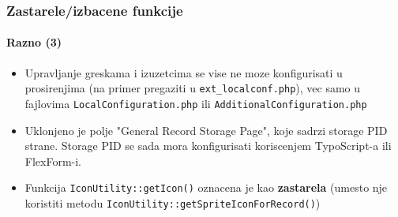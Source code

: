 \begin{frame}[fragile]
	\frametitle{Zastarele/izbacene funkcije}
	\framesubtitle{Razno (3)}

	\begin{itemize}

		\item Upravljanje greskama i izuzetcima se vise ne moze konfigurisati u prosirenjima (na primer pregaziti u
			\texttt{ext\_localconf.php}), vec samo u fajlovima \texttt{LocalConfiguration.php} ili
			\texttt{AdditionalConfiguration.php}

		\item Uklonjeno je polje "General Record Storage Page", koje sadrzi storage PID strane.
			Storage PID se sada mora konfigurisati koriscenjem TypoScript-a ili FlexForm-i.

		\item Funkcija \texttt{IconUtility::getIcon()} oznacena je kao \textbf{zastarela} (umesto nje koristiti metodu \texttt{IconUtility::getSpriteIconForRecord()})

	\end{itemize}

\end{frame}

